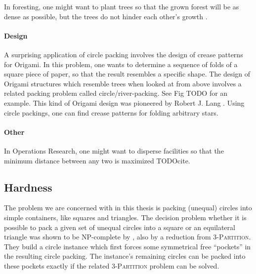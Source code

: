 \documentclass[a4paper,style=print,bibliography=totoc,nexus,lnum,extramargin]{tubsbook}
\begin{document}
In foresting, one might want to plant trees so that the grown forest will be as dense as possible, but the trees do not hinder each other's growth \cite{SMCSCG2007new}.

\paragraph{Design}

A surprising application of circle packing involves the design of crease patterns for Origami. In this problem, one wants to determine a sequence of folds of a square piece of paper, so that the result resembles a specific shape. The design of Origami structures which resemble trees when looked at from above involves a related packing problem called circle/river-packing. See Fig TODO for an example. This kind of Origami design was pioneered by Robert J. Lang \cite{lang1996computational}. Using circle packings, one can find crease patterns for folding arbitrary stars.


\paragraph{Other}

In Operations Research, one might want to disperse facilities so that the minimum distance between any two is maximized TODOcite.


\subsection{Hardness}

The problem we are concerned with in this thesis is packing (unequal) circles into simple containers, like squares and triangles. The decision problem whether it is possible to pack a given set of unequal circles into a square or an equilateral triangle was shown to be NP-complete by \textcite{DFL2010circle}, also by a reduction from \textsc{3-Partition}. They build a circle instance which first forces some symmetrical free “pockets” in the resulting circle packing. The instance's remaining circles can be packed into these pockets exactly if the related \textsc{3-Partition} problem can be solved.
\end{document}
